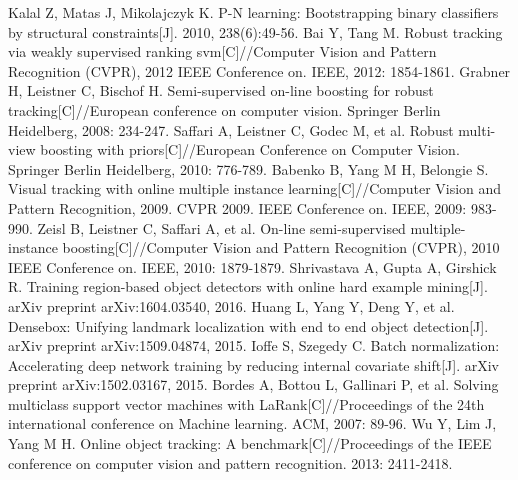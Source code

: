 \begin{thebibliography}{148}
Kalal Z, Matas J, Mikolajczyk K. P-N learning: Bootstrapping binary classifiers by structural constraints[J]. 2010, 238(6):49-56.
Bai Y, Tang M. Robust tracking via weakly supervised ranking svm[C]//Computer Vision and Pattern Recognition (CVPR), 2012 IEEE Conference on. IEEE, 2012: 1854-1861.
Grabner H, Leistner C, Bischof H. Semi-supervised on-line boosting for robust tracking[C]//European conference on computer vision. Springer Berlin Heidelberg, 2008: 234-247.
Saffari A, Leistner C, Godec M, et al. Robust multi-view boosting with priors[C]//European Conference on Computer Vision. Springer Berlin Heidelberg, 2010: 776-789.
Babenko B, Yang M H, Belongie S. Visual tracking with online multiple instance learning[C]//Computer Vision and Pattern Recognition, 2009. CVPR 2009. IEEE Conference on. IEEE, 2009: 983-990.
Zeisl B, Leistner C, Saffari A, et al. On-line semi-supervised multiple-instance boosting[C]//Computer Vision and Pattern Recognition (CVPR), 2010 IEEE Conference on. IEEE, 2010: 1879-1879.
Shrivastava A, Gupta A, Girshick R. Training region-based object detectors with online hard example mining[J]. arXiv preprint arXiv:1604.03540, 2016.
Huang L, Yang Y, Deng Y, et al. Densebox: Unifying landmark localization with end to end object detection[J]. arXiv preprint arXiv:1509.04874, 2015.
Ioffe S, Szegedy C. Batch normalization: Accelerating deep network training by reducing internal covariate shift[J]. arXiv preprint arXiv:1502.03167, 2015.
Bordes A, Bottou L, Gallinari P, et al. Solving multiclass support vector machines with LaRank[C]//Proceedings of the 24th international conference on Machine learning. ACM, 2007: 89-96.
Wu Y, Lim J, Yang M H. Online object tracking: A benchmark[C]//Proceedings of the IEEE conference on computer vision and pattern recognition. 2013: 2411-2418.
\end{thebibliography}
